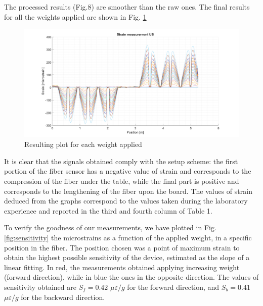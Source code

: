 The processed results (Fig.8) are smoother than the raw ones. The final results for all the weights applied are shown in Fig. \ref{fig:strain}

\begin{figure}[H]
	\centering
	\includegraphics[scale=0.3]{img/nostro.png}
	\caption{Resulting plot for each weight applied}\label{fig:strain}
\end{figure}

It is clear that the signals obtained comply with the setup scheme: the first portion of the fiber sensor has a negative value of strain and corresponds to the compression of the fiber under the table, while the final part is positive and corresponds to the lengthening of the fiber upon the board. The values of strain deduced from the graphs correspond to the values taken during the laboratory experience and reported in the third and fourth column of Table 1.




To verify the goodness of our measurements, we have plotted in Fig. \ref{fig:sensitivity} the microstrains as a function of the applied weight, in a specific position in the fiber. The position chosen was a point of maximum strain to obtain the highest possible sensitivity of the device, estimated as the slope of a linear fitting. In red, the measurements obtained applying increasing weight (forward direction), while in blue the ones in the opposite direction. The values of sensitivity obtained are $S_f = 0.42$ $\mu \varepsilon / g$ for the forward direction, and $S_b = 0.41$ $\mu \varepsilon / g$ for the backward direction.

